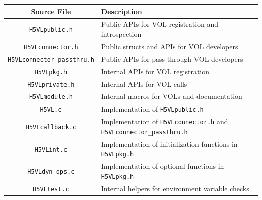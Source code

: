 \begin{table}[!ht]
\begin{tabular}{||c|p{9cm}||}
\hline
\textbf{Source File} & \textbf{Description} \\  [0.1ex]
\hline\hline
\texttt{H5VLpublic.h} & Public APIs for VOL registration and introspection \\
\texttt{H5VLconnector.h} & Public structs and APIs for VOL developers \\
\texttt{H5VLconnector\_passthru.h} & Public APIs for pass-through VOL developers \\
\texttt{H5VLpkg.h} & Internal APIs for VOL registration \\
\texttt{H5VLprivate.h} & Internal APIs for VOL calls \\
\texttt{H5VLmodule.h} & Internal macros for VOLs and documentation \\
\texttt{H5VL.c} & Implementation of \texttt{H5VLpublic.h} \\
\texttt{H5VLcallback.c} & Implementation of \texttt{H5VLconnector.h} and \texttt{H5VLconnector\_passthru.h} \\
\texttt{H5VLint.c} & Implementation of initialization functions in \texttt{H5VLpkg.h} \\
\texttt{H5VLdyn\_ops.c} & Implementation of optional functions in \texttt{H5VLpkg.h} \\
\texttt{H5VLtest.c} & Internal helpers for environment variable checks \\
\hline
\end{tabular}
\label{table:VOL_src_files}
\end{table}



